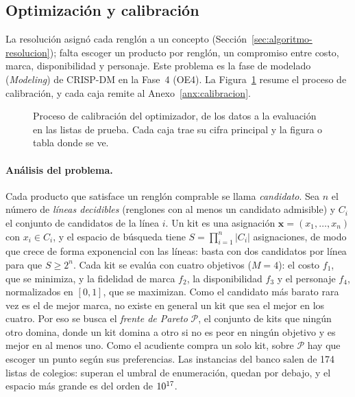 \subsection{Optimización y calibración}
\label{sec:optimizacion-cal}

La resolución asignó cada renglón a un concepto (Sección~\ref{sec:algoritmo-resolucion}); falta escoger un producto por
renglón, un compromiso entre costo, marca, disponibilidad y personaje. Este problema es
la fase de modelado (\emph{Modeling}) de CRISP-DM en la Fase~4 (OE4).  La
Figura~\ref{fig:calibracion-flujo} resume el proceso de calibración, y cada caja remite al Anexo~\ref{anx:calibracion}.

\begin{figure}[!htb]
\centering
\resizebox{\textwidth}{!}{}
\caption[Proceso de calibración del optimizador.]{Proceso de calibración del optimizador, de los
datos a la evaluación en las listas de prueba. Cada caja trae su cifra principal y la figura o tabla
donde se ve.}
\label{fig:calibracion-flujo}
\end{figure}

\paragraph{Análisis del problema.} Cada producto que satisface un renglón comprable se llama \emph{candidato}. Sea $n$ el número de
\emph{líneas decidibles} (renglones con al menos un candidato admisible) y $C_i$
el conjunto de candidatos de la línea $i$. Un kit es una asignación
$\mathbf{x}=(x_1,\dots,x_n)$ con $x_i\in C_i$, y el espacio de búsqueda tiene
$S=\prod_{i=1}^{n}|C_i|$ asignaciones, de modo que crece de forma exponencial con las líneas:
basta con dos candidatos por línea para que $S\geq 2^n$. Cada kit se evalúa con cuatro objetivos
($M=4$): el costo $f_1$, que se minimiza, y la fidelidad de marca $f_2$, la disponibilidad $f_3$ y
el personaje $f_4$, normalizados en $[0,1]$, que se maximizan. Como el candidato más barato rara
vez es el de mejor marca, no existe en general un kit que sea el mejor en los cuatro. Por eso se
busca el \emph{frente de Pareto} $\mathcal{P}$, el conjunto de kits que ningún otro domina, donde
un kit domina a otro si no es peor en ningún objetivo y es mejor en al menos uno. Como el acudiente compra un solo kit, sobre $\mathcal{P}$ hay que escoger un
punto según sus preferencias. Las \calListas{} instancias del banco salen de 174 listas de
\calColegios{} colegios: \calListasNsga{} superan el umbral de enumeración, \calListasExacto{} quedan
por debajo, y el espacio más grande es del orden de $10^{17}$.

